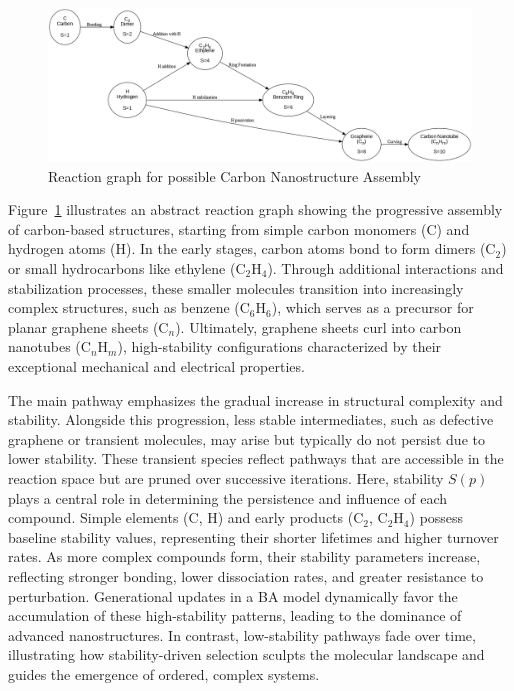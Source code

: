\documentclass[entropy,article,submit,pdftex,moreauthors]{Definitions/mdpi}
\begin{document}
\begin{figure}[h]
    \centering
    \includegraphics[width=1\textwidth,height=0.55\textwidth]{abc_nano.png}
    \caption{Reaction graph for possible Carbon Nanostructure Assembly}
    \label{fig:abc_nano}
\end{figure}

Figure~\ref{fig:abc_nano} illustrates an abstract reaction graph showing the progressive assembly of carbon-based structures, starting from simple carbon monomers (\( \text{C} \)) and hydrogen atoms (\( \text{H} \)). In the early stages, carbon atoms bond to form dimers (\( \text{C}_2 \)) or small hydrocarbons like ethylene (\( \text{C}_2\text{H}_4 \)). Through additional interactions and stabilization processes, these smaller molecules transition into increasingly complex structures, such as benzene (\( \text{C}_6\text{H}_6 \)), which serves as a precursor for planar graphene sheets (\( \text{C}_n \)). Ultimately, graphene sheets curl into carbon nanotubes (\( \text{C}_n\text{H}_m \)), high-stability configurations characterized by their exceptional mechanical and electrical properties. 

The main pathway emphasizes the gradual increase in structural complexity and stability. Alongside this progression, less stable intermediates, such as defective graphene or transient molecules, may arise but typically do not persist due to lower stability. These transient species reflect pathways that are accessible in the reaction space but are pruned over successive iterations. Here, stability \( S(p) \) plays a central role in determining the persistence and influence of each compound. Simple elements (\( \text{C} \), \( \text{H} \)) and early products (\( \text{C}_2 \), \( \text{C}_2\text{H}_4 \)) possess baseline stability values, representing their shorter lifetimes and higher turnover rates. As more complex compounds form, their stability parameters increase, reflecting stronger bonding, lower dissociation rates, and greater resistance to perturbation. Generational updates in a BA model dynamically favor the accumulation of these high-stability patterns, leading to the dominance of advanced nanostructures. In contrast, low-stability pathways fade over time, illustrating how stability-driven selection sculpts the molecular landscape and guides the emergence of ordered, complex systems.
\end{document}
